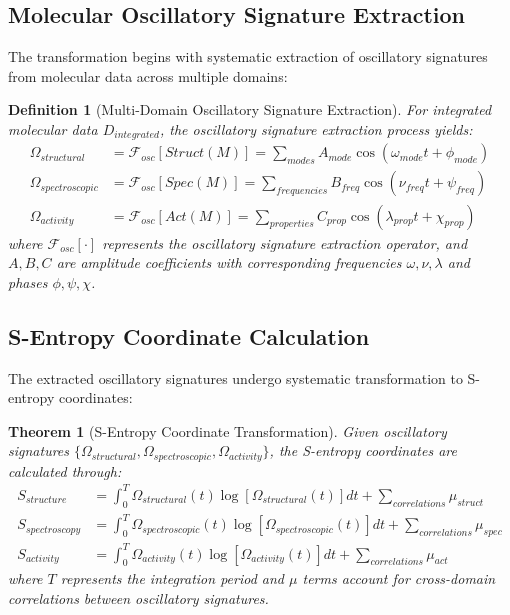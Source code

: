 \documentclass[12pt,a4paper]{article}
\newtheorem{theorem}{Theorem}
\newtheorem{definition}{Definition}
\begin{document}
\subsection{Molecular Oscillatory Signature Extraction}

The transformation begins with systematic extraction of oscillatory signatures from molecular data across multiple domains:

\begin{definition}[Multi-Domain Oscillatory Signature Extraction]
For integrated molecular data $D_{integrated}$, the oscillatory signature extraction process yields:
\begin{align}
\Omega_{structural} &= \mathcal{F}_{osc}[Struct(M)] = \sum_{modes} A_{mode} \cos(\omega_{mode} t + \phi_{mode}) \\
\Omega_{spectroscopic} &= \mathcal{F}_{osc}[Spec(M)] = \sum_{frequencies} B_{freq} \cos(\nu_{freq} t + \psi_{freq}) \\
\Omega_{activity} &= \mathcal{F}_{osc}[Act(M)] = \sum_{properties} C_{prop} \cos(\lambda_{prop} t + \chi_{prop})
\end{align}
where $\mathcal{F}_{osc}[\cdot]$ represents the oscillatory signature extraction operator, and $A, B, C$ are amplitude coefficients with corresponding frequencies $\omega, \nu, \lambda$ and phases $\phi, \psi, \chi$.
\end{definition}

\subsection{S-Entropy Coordinate Calculation}

The extracted oscillatory signatures undergo systematic transformation to S-entropy coordinates:

\begin{theorem}[S-Entropy Coordinate Transformation]
Given oscillatory signatures $\{\Omega_{structural}, \Omega_{spectroscopic}, \Omega_{activity}\}$, the S-entropy coordinates are calculated through:
\begin{align}
S_{structure} &= \int_0^T \Omega_{structural}(t) \log[\Omega_{structural}(t)] dt + \sum_{correlations} \mu_{struct} \\
S_{spectroscopy} &= \int_0^T \Omega_{spectroscopic}(t) \log[\Omega_{spectroscopic}(t)] dt + \sum_{correlations} \mu_{spec} \\
S_{activity} &= \int_0^T \Omega_{activity}(t) \log[\Omega_{activity}(t)] dt + \sum_{correlations} \mu_{act}
\end{align}
where $T$ represents the integration period and $\mu$ terms account for cross-domain correlations between oscillatory signatures.
\end{theorem}
\end{document}
